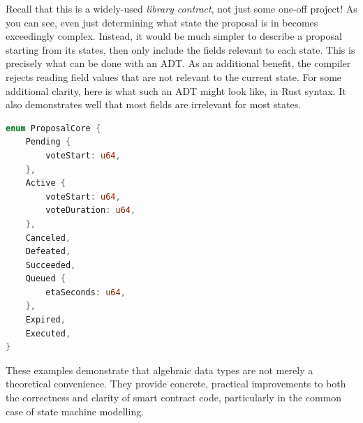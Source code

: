 Recall that this is a widely-used \textit{library contract}, not just some one-off project! As you can see, even just determining what state the proposal is in becomes exceedingly complex. Instead, it would be much simpler to describe a proposal starting from its states, then only include the fields relevant to each state. This is precisely what can be done with an ADT. As an additional benefit, the compiler rejects reading field values that are not relevant to the current state. For some additional clarity, here is what such an ADT might look like, in Rust syntax. It also demonstrates well that most fields are irrelevant for most states.
\begin{lstlisting}[language=Rust, style=boxed]
enum ProposalCore {
    Pending {
        voteStart: u64,
    },
    Active {
        voteStart: u64,
        voteDuration: u64,
    },
    Canceled,
    Defeated,
    Succeeded,
    Queued {
        etaSeconds: u64,
    },
    Expired,
    Executed,
}
\end{lstlisting}

These examples demonstrate that algebraic data types are not merely a theoretical convenience. They provide concrete, practical improvements to both the correctness and clarity of smart contract code, particularly in the common case of state machine modelling.













